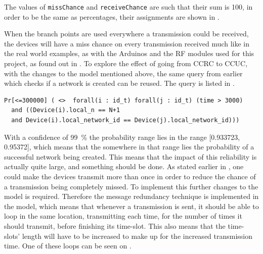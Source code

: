 \noindent
The values of \texttt{missChance} and \texttt{receiveChance} are such that their sum is 100, in order to be the same as percentages, their assignments are shown in .

When the branch points are used everywhere a transmission could be received, the devices will have a miss chance on every transmission received much like in the real world examples, as with the Arduinos and the RF modules used for this project, as found out in .
To explore the effect of going from CCRC to CCUC, with the changes to the model mentioned above, the same query from earlier which checks if a network is created can be reused. 
The query is listed in .

\begin{lstlisting}[style=UPPAAL, caption={Query for UPPAAL which asks for the probability of all devices in a network being equal to the number of devices in the system, and that they all have the same \texttt{network\_id}}, label={query-SuccesfulCreate}]
Pr[<=300000] ( <>  forall(i : id_t) forall(j : id_t) (time > 3000) 
  and ((Device(i).local_n == N+1 
  and Device(i).local_network_id == Device(j).local_network_id)))
\end{lstlisting}

\noindent
With a confidence of 99~\% the probability range lies in the range [0.933723, 0.95372], which means that the somewhere in that range lies the probability of a successful network being created.
This means that the impact of this reliability is actually quite large, and something should be done.
As stated earlier in , one could make the devices transmit more than once in order to reduce the chance of a transmission being completely missed.
To implement this further changes to the model is required.
Therefore the message redundancy technique is implemented in the model, which means that whenever a transmission is sent, it should be able to loop in the same location, transmitting each time, for the number of times it should transmit, before finishing its time-slot. 
This also means that the time-slots' length will have to be increased to make up for the increased transmission time.
One of these loops can be seen on .

